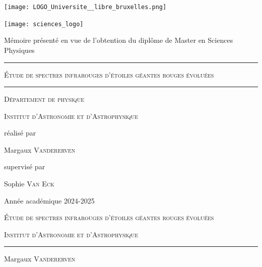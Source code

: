 \documentclass{article}
\begin{document}
\begin{titlepage}

\begin{minipage}{.3\textwidth}%
        \centering
        \texttt{[image: LOGO\_Universite\_\_libre\_bruxelles.png]}\par\vspace{0.2cm}
        \end{minipage}%
        \hfill
        \begin{minipage}{.25\textwidth}%
        \centering
        \texttt{[image: sciences\_logo]}\par\vspace{0.2cm}
        \end{minipage}%

\centering	\vspace{4cm}
	{\large Mémoire présenté en vue de l'obtention du diplôme de Master en
Sciences Physiques}\par\vspace{0.8cm}
	\rule{0.5\linewidth}{1pt}
	\vspace{0.8cm}\par 
	{\huge \textsc{Étude de spectres infrarouges d'étoiles géantes rouges évoluées} \par}
	\vspace{0.8cm}
	\rule{0.5\linewidth}{1pt}
	\vspace{1cm} \par 
	{\Large \textsc{Département de physique}} \par 
	{\Large \textsc{Institut d'Astronomie et d'Astrophysique}}\par\vspace{0.8cm}\vspace{3cm} \par 
	réalisé par\par
        {\large Margaux \textsc{Vandererven}\par \vspace{1cm} \par         
        }
		supervisé par\par
	\large Sophie \textsc{Van Eck}
	\vfill

	{\large Année académique 2024-2025 \par}

\end{titlepage}



\pagestyle{empty}
\vfill

\centering	
	{\LARGE \textsc{Étude de spectres infrarouges d'étoiles géantes rouges évoluées} \par}
	\vspace{0.5cm}
	{\textsc{Institut d'Astronomie et d'Astrophysique}}\par\vspace{0.1cm} \par 
	\rule{0.3\linewidth}{0.4pt} \par
	\vspace{0.5cm}
	Margaux \textsc{Vandererven}\par \vspace{0.7cm} \par 
	\vspace{0.cm}
	
\end{document}
